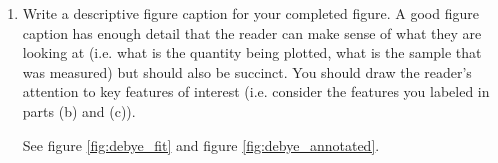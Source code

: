 \begin{enumerate}
    \item Write a descriptive figure caption for your completed figure. A good figure caption has enough detail that the reader can make sense of what they are looking at (i.e. what is the quantity being plotted, what is the sample that was measured) but should also be succinct. You should draw the reader's attention to key features of interest (i.e. consider the features you labeled in parts (b) and (c)).

    \divider 

    See figure \ref{fig:debye_fit} and figure \ref{fig:debye_annotated}.


\end{enumerate}



